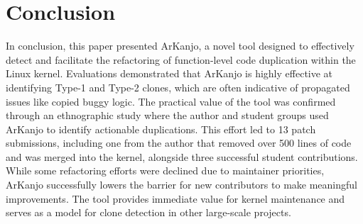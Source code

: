 \documentclass[conference]{IEEEtran}
\begin{document}
\section{Conclusion}

In conclusion, this paper presented ArKanjo, a novel tool designed to effectively detect 
and facilitate the refactoring of function-level code duplication within the Linux kernel. 
Evaluations demonstrated that ArKanjo is highly effective at identifying Type-1 and Type-2 
clones, which are often indicative of propagated issues like copied buggy logic. The practical 
value of the tool was confirmed through an ethnographic study where the author and student 
groups used ArKanjo to identify actionable duplications. This effort led to 13 patch 
submissions, including one from the author that removed over 500 lines of code and was merged 
into the kernel, alongside three successful student contributions. While some refactoring 
efforts were declined due to maintainer priorities, ArKanjo successfully lowers the barrier 
for new contributors to make meaningful improvements. The tool provides immediate value for 
kernel maintenance and serves as a model for clone detection in other large-scale projects.


%
%

\end{document}
